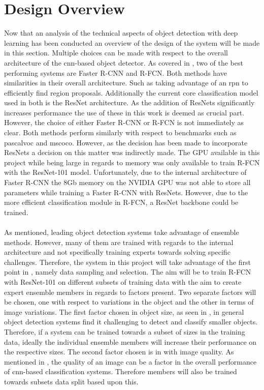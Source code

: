 \section{Design Overview}
Now that an analysis of the technical aspects of object detection with deep learning has been conducted an overview of the design of the system will be made in this section. 
Multiple choices can be made with respect to the overall architecture of the \gls{cnn}-based object detector. As covered in , two of the best performing systems are Faster R-CNN and R-FCN. Both methods have similarities in their overall architecture. Such as taking advantage of an \gls{rpn} to efficiently find region proposals. Additionally the current core classification model used in both is the ResNet architecture. As the addition of ResNets significantly increases performance the use of these in this work is deemed as crucial part. However, the choice of either Faster R-CNN or R-FCN is not immediately as clear. Both methods perform similarly with respect to benchmarks such as \gls{pascalvoc} and \gls{mscoco}. However, as the decision has been made to incorporate ResNets a decision on this matter was indirectly made. The GPU available in this project while being large in regards to memory was only available to train R-FCN with the ResNet-101 model. Unfortunately, due to the internal architecture of Faster R-CNN the 8Gb memory on the NVIDIA GPU was not able to store all parameters while training a Faster R-CNN with ResNets. However, due to the more efficient classification module in R-FCN, a ResNet backbone could be trained.
\\\\
As mentioned, leading object detection systems take advantage of ensemble methods. However, many of them are trained with regards to the internal architecture and not specifically training experts towards solving specific challenges. Therefore, the system in this project will take advantage of the first point in , namely data sampling and selection. The aim will be to train R-FCN with ResNet-101 on different subsets of training data with the aim to create expert ensemble members in regards to factors present. Two separate factors will be chosen, one with respect to variations in the object and the other in terms of image variations. The first factor chosen in object size, as seen in , in general object detection systems find it challenging to detect and classify smaller objects. Therefore, if a system can be trained towards a subset of sizes in the training data, ideally the individual ensemble members will increase their performance on the respective sizes. The second factor chosen is in with image quality. As mentioned in , the quality of an image can be a factor in the overall performance of \gls{cnn}-based classification systems. Therefore members will also be trained towards subsets data split based upon this.
